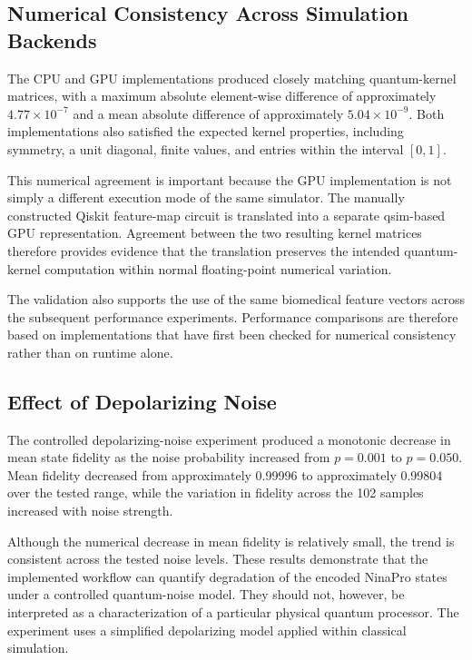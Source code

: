 \documentclass[pdflatex,sn-mathphys-num]{sn-jnl}%
\theoremstyle{thmstyleone}%
\theoremstyle{thmstyletwo}%
\theoremstyle{thmstylethree}%
\begin{document}
\subsection{Numerical Consistency Across Simulation Backends}
\label{subsec:numerical-discussion}

The CPU and GPU implementations produced closely matching quantum-kernel
matrices, with a maximum absolute element-wise difference of approximately
$4.77\times10^{-7}$ and a mean absolute difference of approximately
$5.04\times10^{-9}$. Both implementations also satisfied the expected kernel
properties, including symmetry, a unit diagonal, finite values, and entries
within the interval $[0,1]$.

This numerical agreement is important because the GPU implementation is not
simply a different execution mode of the same simulator. The manually
constructed Qiskit feature-map circuit is translated into a separate qsim-based
GPU representation. Agreement between the two resulting kernel matrices
therefore provides evidence that the translation preserves the intended
quantum-kernel computation within normal floating-point numerical variation.

The validation also supports the use of the same biomedical feature vectors
across the subsequent performance experiments. Performance comparisons are
therefore based on implementations that have first been checked for numerical
consistency rather than on runtime alone.


\subsection{Effect of Depolarizing Noise}
\label{subsec:noise-discussion}

The controlled depolarizing-noise experiment produced a monotonic decrease in
mean state fidelity as the noise probability increased from $p=0.001$ to
$p=0.050$. Mean fidelity decreased from approximately 0.99996 to approximately
0.99804 over the tested range, while the variation in fidelity across the
102 samples increased with noise strength.

Although the numerical decrease in mean fidelity is relatively small, the
trend is consistent across the tested noise levels. These results demonstrate
that the implemented workflow can quantify degradation of the encoded NinaPro
states under a controlled quantum-noise model. They should not, however, be
interpreted as a characterization of a particular physical quantum processor.
The experiment uses a simplified depolarizing model applied within classical
simulation.
\end{document}
